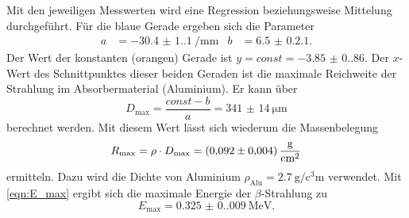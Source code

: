 Mit den jeweiligen Messwerten wird eine Regression beziehungsweise Mittelung durchgeführt. 
Für die blaue Gerade ergeben sich die Parameter
\begin{align*}
  a &= \qty{-30.4(1.1)}{\per\milli\metre} & b &= \num{6.5(0.21)}.
\end{align*}
Der Wert der konstanten (orangen) Gerade ist $y = const = \num{-3.85(0.86)}$.
Der $x$-Wert des Schnittpunktes dieser beiden Geraden ist die maximale Reichweite der Strahlung im Absorbermaterial (Aluminium). Er kann über
\begin{equation*}
  D_\text{max} = \frac{const -b}{a} = \qty{341(14)}{\micro\metre}
\end{equation*}
berechnet werden.
Mit diesem Wert lässt sich wiederum die Massenbelegung
\begin{equation*}
    R_\text{max} = \rho \cdot D_\text{max} = \qty{0.092+-0.004}{\gram\per\square\centi\metre}
\end{equation*}
ermitteln. Dazu wird die Dichte von Aluminium $\rho_\text{Alu} = \qty{2.7}{\gram\per\cubic\centi\metre}$ \cite{Gestis} verwendet.
Mit \autoref{eqn:E_max} ergibt sich die maximale Energie der $\beta$-Strahlung zu
\begin{equation*}
  E_\text{max} = \qty{0.325(0.009)}{\mega\electronvolt}.
\end{equation*}
